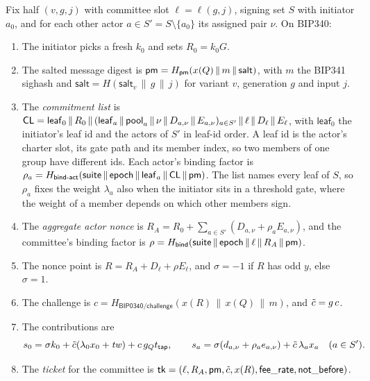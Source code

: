 Fix half $(v, g, j)$ with committee slot $\ell = \ell(g, j)$, signing set $S$ with initiator $a_0$, and for each other actor $a \in S' = S \setminus \{a_0\}$ its assigned pair $\nu$. On BIP340:
\begin{enumerate}[leftmargin=1.5em]
\item The initiator picks a fresh $k_0$ and sets $R_0 = k_0 G$.
\item The salted message digest is $\mathsf{pm} = H_{\mathsf{pm}}(x(Q) \,\|\, m \,\|\, \mathsf{salt})$, with $m$ the BIP341 sighash and $\mathsf{salt} = H(\mathsf{salt}_v \,\|\, g \,\|\, j)$ for variant $v$, generation $g$ and input $j$.
\item The \emph{commitment list} is $\mathsf{CL} = \mathsf{leaf}_0 \,\|\, R_0 \,\|\, (\mathsf{leaf}_a \,\|\, \mathsf{pool}_a \,\|\, \nu \,\|\, D_{a,\nu} \,\|\, E_{a,\nu})_{a \in S'} \,\|\, \ell \,\|\, D_\ell \,\|\, E_\ell$, with $\mathsf{leaf}_0$ the initiator's leaf id and the actors of $S'$ in leaf-id order. A leaf id is the actor's charter slot, its gate path and its member index, so two members of one group have different ids. Each actor's binding factor is $\rho_a = H_{\mathsf{bind\text{-}act}}(\mathsf{suite} \,\|\, \mathsf{epoch} \,\|\, \mathsf{leaf}_a \,\|\, \mathsf{CL} \,\|\, \mathsf{pm})$. The list names every leaf of $S$, so $\rho_a$ fixes the weight $\lambda_a$ also when the initiator sits in a threshold gate, where the weight of a member depends on which other members sign.
\item The \emph{aggregate actor nonce} is $R_A = R_0 + \sum_{a \in S'} (D_{a,\nu} + \rho_a E_{a,\nu})$, and the committee's binding factor is $\rho = H_{\mathsf{bind}}(\mathsf{suite} \,\|\, \mathsf{epoch} \,\|\, \ell \,\|\, R_A \,\|\, \mathsf{pm})$.
\item The nonce point is $R = R_A + D_\ell + \rho E_\ell$, and $\sigma = -1$ if $R$ has odd $y$, else $\sigma = 1$.
\item The challenge is $c = H_{\mathsf{BIP0340/challenge}}(x(R) \,\|\, x(Q) \,\|\, m)$, and $\tilde{c} = g\,c$.
\item The contributions are
\[
  s_0 = \sigma k_0 + \tilde{c}(\lambda_0 x_0 + \mathit{tw}) + c\,g_Q t_{\mathsf{tap}}, \qquad
  s_a = \sigma(d_{a,\nu} + \rho_a e_{a,\nu}) + \tilde{c}\,\lambda_a x_a \quad (a \in S').
\]
\item The \emph{ticket} for the committee is $\mathsf{tk} = (\ell, R_A, \mathsf{pm}, \tilde{c}, x(R), \mathsf{fee\_rate}, \mathsf{not\_before})$.
\end{enumerate}
